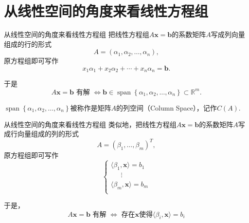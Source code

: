 \documentclass[10pt]{beamer}
\begin{document}

\section{从线性空间的角度来看线性方程组}


\begin{frame}

\begin{block}{从线性空间的角度来看线性方程组}
把线性方程组$A\mathbf{x} = \mathbf{b}$的系数矩阵$A$写成列向量组成的行的形式
$$A = (\alpha_1, \alpha_2, \ldots, \alpha_n),$$
原方程组即可写作
$$x_1\alpha_1 + x_2\alpha_2 + \cdots + x_n\alpha_n = \mathbf{b}.$$

\pause

于是
$$A\mathbf{x} = \mathbf{b} \text{ 有解 } \Longleftrightarrow \mathbf{b} \in \operatorname{span}\left\{ \alpha_1, \alpha_2, \ldots, \alpha_n \right\} \subset \mathbb{R}^m.$$

$\operatorname{span}\left\{ \alpha_1, \alpha_2, \ldots, \alpha_n \right\}$被称作是矩阵$A$的列空间（Column Space），记作$C(A)$.
\end{block}

\end{frame}


\begin{frame}

\begin{block}{从线性空间的角度来看线性方程组}
类似地，把线性方程组$A\mathbf{x} = \mathbf{b}$的系数矩阵$A$写成行向量组成的列的形式
$$A = (\beta_1, \ldots, \beta_m)^T,$$
原方程组即可写作
$$\begin{cases}
\langle \beta_1, \mathbf{x} \rangle = b_1 \\
\phantom{yyy} \vdots \\
\langle \beta_m, \mathbf{x} \rangle = b_m \\
\end{cases}$$

\pause

于是，
$$A\mathbf{x} = \mathbf{b} \text{ 有解 } \Longleftrightarrow \text{ 存在$\mathbf{x}$使得$\langle \beta_i, \mathbf{x} \rangle = b_i$}$$
\end{block}

\end{frame}
\end{document}
